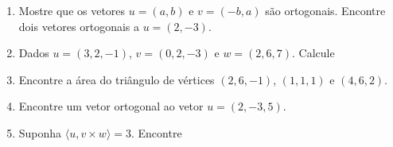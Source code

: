 \documentclass[a4paper,5pt]{amsbook}
\begin{document}
\begin{enumerate}

	\vspace{0.5cm}
	\item Mostre que os vetores $u=(a,b)$ e $v=(-b,a)$ s\~ao ortogonais. Encontre
		dois vetores ortogonais a $u=(2,-3)$. 

	\vspace{0.5cm}
	\item Dados $u=(3,2,-1)$, $v=(0,2,-3)$ e $w=(2,6,7)$. Calcule


	\vspace{0.5cm}
	\item Encontre a \'area do tri\^angulo de v\'ertices $(2,6,-1)$, $(1,1,1)$ e $(4,6,2)$.
	
	\vspace{0.5cm}
	\item Encontre um vetor ortogonal ao vetor $u=(2,-3,5)$.

	\vspace{0.5cm}
	\item Suponha $\langle u, v \times w \rangle = 3$. Encontre



\end{enumerate}
\end{document}
